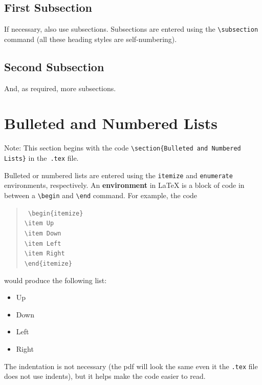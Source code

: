 \documentclass[11pt]{report}
\newcommand{\cmd}[1]{\texttt{\textbackslash{}#1}}
\begin{document}
\subsection{First Subsection}
If necessary, also use subsections. Subsections are entered using the \cmd{subsection} command (all these heading styles are self-numbering).


\subsection{Second Subsection}
And, as required, more subsections.

\section{Bulleted and Numbered Lists}
Note: This section begins with the code \texttt{\textbackslash{}section\{Bulleted and Numbered Lists\}} in the~\texttt{.tex} file.

Bulleted or numbered lists are entered using the \texttt{itemize} and \texttt{enumerate} environments, respectively. An \textbf{environment} in \LaTeX{} is a block of code in between a \cmd{begin} and \cmd{end} command. For example, the code
\begin{quote}\tt
	\textbackslash{}begin\{itemize\} \\[-0.5em]
	\hspace*{2em}\textbackslash{}item Up \\[-0.5em]
	\hspace*{2em}\textbackslash{}item Down \\[-0.5em]
	\hspace*{2em}\textbackslash{}item Left \\[-0.5em]
	\hspace*{2em}\textbackslash{}item Right \\[-0.5em]
	\textbackslash{}end\{itemize\}
\end{quote}
would produce the following list:
\begin{itemize} \item Up \item Down \item Left \item Right \end{itemize}
The indentation is not necessary (the pdf will look the same even it the \texttt{.tex} file does not use indents), but it helps make the code easier to read.
\end{document}
